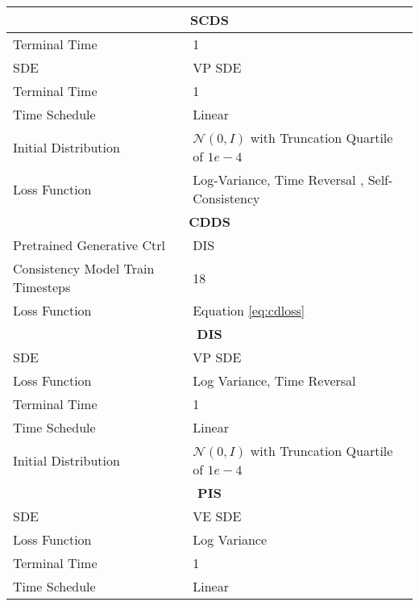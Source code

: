 \begin{table*} %
    \centering
    \renewcommand{\arraystretch}{1.3}  %
    \begin{minipage}[t]{.45\textwidth}
    \vspace{0pt} 
        \begin{tabular}{p{4cm} p{4cm}}  
            \toprule
            \multicolumn{2}{c}{\textbf{SCDS}} \\  
            \midrule
            Terminal Time & 1 \\
            SDE & VP SDE \\ 
            Terminal Time & 1 \\
            Time Schedule & Linear \\ 
            Initial Distribution & $\mathcal{N}(0, I)$ with Truncation Quartile of $1e-4$ \\
            Loss Function & Log-Variance, Time Reversal \citep{berner2024dis, richter2024improved}, Self-Consistency\\ 
            \midrule 
            \multicolumn{2}{c}{\textbf{CDDS}} \\  
            \midrule
            Pretrained Generative Ctrl & DIS \\ 
            Consistency Model Train Timesteps & 18 \\ 
            Loss Function & Equation \eqref{eq:cdloss} \\
            \midrule 
            \multicolumn{2}{c}{\textbf{DIS} \citep{berner2024dis}}  \\
            \midrule 
            SDE & VP SDE \\ 
            Loss Function & Log Variance, Time Reversal \\ 
            Terminal Time & 1 \\
            Time Schedule & Linear \\ 
            Initial Distribution & $\mathcal{N}(0, I)$ with Truncation Quartile of $1e-4$ \\
            \midrule
            \multicolumn{2}{c}{\textbf{PIS} \citep{zhang2022pis}}  \\
            \midrule 
            SDE & VE SDE \\ 
            Loss Function & Log Variance \citep{richter2024improved}\\ 
            Terminal Time & 1 \\
            Time Schedule & Linear \\ 

\end{tabular}
\end{minipage}
\end{table*}
